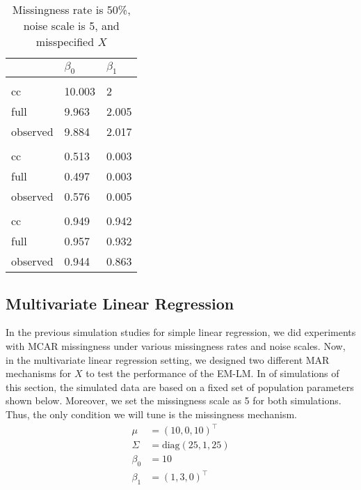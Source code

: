 \documentclass[
  twocolumn]{article}
\begin{document}
\begin{table}[h]
\caption{Missingness rate is 50\%, noise scale is 5, and misspecified $X$}
\begingroup\fontsize{7}{9}\selectfont

\begin{tabu} to 
\toprule
 & $\beta_0$ & $\beta_1$\\
\midrule
\addlinespace[0.3em]
\\
\hspace{1em}cc & 10.003 & 2\\
\hspace{1em}full & 9.963 & 2.005\\
\hspace{1em}observed & 9.884 & 2.017\\
\addlinespace[0.3em]
\\
\hspace{1em}cc & 0.513 & 0.003\\
\hspace{1em}full & 0.497 & 0.003\\
\hspace{1em}observed & 0.576 & 0.005\\
\addlinespace[0.3em]
\\
\hspace{1em}cc & 0.949 & 0.942\\
\hspace{1em}full & 0.957 & 0.932\\
\hspace{1em}observed & 0.944 & 0.863\\
\bottomrule
\end{tabu}
\endgroup{}
\end{table}

\hypertarget{multivariate-linear-regression}{%
\subsection{Multivariate Linear
Regression}\label{multivariate-linear-regression}}

In the previous simulation studies for simple linear regression, we did
experiments with MCAR missingness under various missingness rates and
noise scales. Now, in the multivariate linear regression setting, we
designed two different MAR mechanisms for \(X\) to test the performance
of the EM-LM. In of simulations of this section, the simulated data are
based on a fixed set of population parameters shown below. Moreover, we
set the missingness scale as 5 for both simulations. Thus, the only
condition we will tune is the missingness mechanism. \[
\begin{aligned}
\mu &= (10, 0, 10)^{\top} \\
\Sigma &= \text{diag}(25, 1, 25) \\
\beta_0 &= 10 \\
\beta_1 &= (1, 3, 0)^{\top}
\end{aligned}
\]
\end{document}
